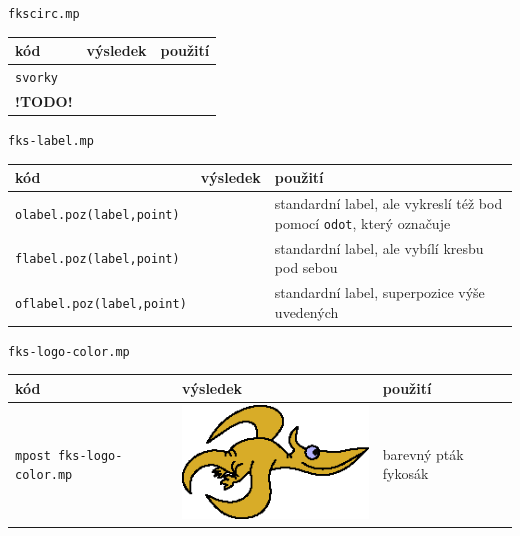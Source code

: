 \documentclass[a4paper,10pt]{article}
\begin{document}
{\centering\large\texttt{fkscirc.mp}\nopagebreak\\\medskip\noindent}
\begin{tabularx}{\textwidth}{|l|l|X|}\hline
    kód & výsledek & použití\\\hline
    \verb+svorky+ & &\\\hline
    {\bf !TODO!} & &\\\hline
\end{tabularx}\bigskip

{\centering\large\texttt{fks-label.mp}\nopagebreak\\\medskip\noindent}
\begin{tabularx}{\textwidth}{|l|l|X|}\hline
    kód & výsledek & použití\\\hline
    \verb+olabel.poz(label,point)+ & & 
	standardní label, ale vykreslí též bod pomocí \verb+odot+, 
	který označuje\\\hline
    \verb+flabel.poz(label,point)+ & & 
	standardní label, ale vybílí kresbu pod sebou\\\hline
    \verb+oflabel.poz(label,point)+ & & 
	standardní label, superpozice výše uvedených\\\hline
\end{tabularx}\bigskip

{\centering\large\texttt{fks-logo-color.mp}\nopagebreak\\\medskip\noindent}
\begin{tabularx}{\textwidth}{|l|l|X|}\hline
    kód & výsledek & použití\\\hline
    \verb+mpost fks-logo-color.mp+&\includegraphics{fks-logo-color}& 
	barevný pták fykosák\\\hline
\end{tabularx}\bigskip
\end{document}
